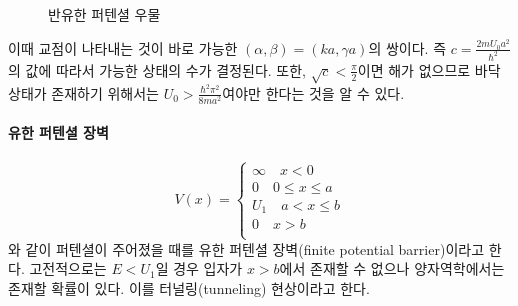 \begin{enumerate}
\begin{figure}[h!]
\caption{반유한 퍼텐셜 우물}
\label{fig:half-finite}
\end{figure}
이때 교점이 나타내는 것이 바로 가능한 $(\alpha, \beta)=(ka,\gamma a)$의 쌍이다. 즉 $c =\frac{2mU_0a^2}{\hbar^2}$의 값에 따라서 가능한 상태의 수가 결정된다. 또한, $\sqrt{c}<\frac{\pi}{2}$이면 해가 없으므로 바닥 상태가 존재하기 위해서는  $U_0>\frac{\hbar^2\pi^2}{8ma^2}$여야만 한다는 것을 알 수 있다.
\end{enumerate}

\paragraph{유한 퍼텐셜 장벽}
\begin{equation}
V(x)=\begin{cases}
\infty\quad x<0\\
0\quad 0\le x\le a\\
U_1 \quad a< x\le b\\
0 \quad x>b\\
\end{cases}
\end{equation}
와 같이 퍼텐셜이 주어졌을 때를 유한 퍼텐셜 장벽(finite potential barrier)이라고 한다. 고전적으로는 $E<U_1$일 경우 입자가 $x>b$에서 존재할 수 없으나 양자역학에서는 존재할 확률이 있다. 이를 터널링(tunneling) 현상이라고 한다.

